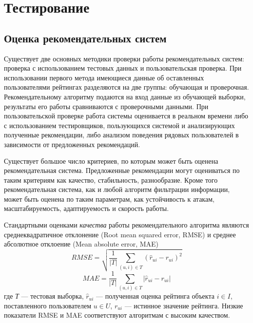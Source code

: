 \documentclass[a4paper, 12pt]{article} %
\begin{document}
\section{Тестирование}


\subsection{Оценка рекомендательных систем}

Существует две основных методики проверки работы рекомендательных систем: проверка с использованием тестовых данных и пользовательская проверка. При использовании первого метода имеющиеся данные об оставленных пользователями рейтингах разделяются на две группы: обучающая и проверочная. Рекомендательному алгоритму подаются на вход данные из обучающей выборки, результаты его работы сравниваются с проверочными данными. При пользовательской проверке работа системы оценивается в реальном времени либо с использованием тестировщиков, пользующихся системой и анализирующих полученные рекомендации, либо анализом поведения рядовых пользователей в зависимости от предложенных рекомендаций.

Существует большое число критериев, по которым может быть оценена рекомендательная система. Предложенные рекомендации могут оцениваться по таким критериям как качество, стабильность, разнообразие. Кроме того рекомендательная система, как и любой алгоритм фильтрации информации, может быть оценена по таким параметрам, как устойчивость к атакам, масштабируемость, адаптируемость и скорость работы.

Стандартными оценками \textit{качества} работы рекомендательного алгоритма являются среднеквадратичное отклонение (Root mean squared error, RMSE) и среднее абсолютное отклоение (Mean absolute error, MAE)
\[
	RMSE=\sqrt{\frac{1}{|T|}\sum_{(u,i)\in T} (\hat{r}_{ui} - r_{ui})^2}
\]
\[	
	MAE=\frac{1}{|T|}\sum_{(u,i)\in T} |\hat{r}_{ui} - r_{ui}|
\]
где \textit{Т} --- тестовая выборка,  $\hat{r}_{ui}$ --- полученная оценка рейтинга объекта $i \in I$, поставленного пользователем $u \in U$,  $r_{ui}$ --- истинное значение рейтинга. Низкие показатели RMSE и MAE соответствуют алгоритмам с высоким качеством.
  
\end{document}
